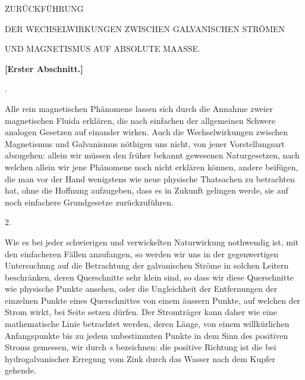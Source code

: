 \clearpage\begingroup
\NoSourceHead{}
\begin{center}
{\Large{}}\par\bigskip
ZURÜCKFÜHRUNG\par
DER WECHSELWIRKUNGEN ZWISCHEN GALVANISCHEN STRÖMEN\par
UND MAGNETISMUS AUF ABSOLUTE MAASSE.\par\bigskip
\textbf{[Erster Abschnitt.]}\par{}.
\end{center}
\noindent\hspace*{\parindent}Alle rein magnetischen Phänomene lassen sich durch die Annahme zweier magnetischen Fluida erklären, die nach einfachen der allgemeinen Schwere analogen Gesetzen auf einander wirken. Auch die Wechselwirkungen zwischen Magnetismus und Galvanismus nöthigen uns nicht, von jener Vorstellungsart abzugehen: allein wir müssen den früher bekannt gewesenen Naturgesetzen, nach welchen allein wir jene Phänomene noch nicht erklären können, andere beifügen, die man vor der Hand wenigstens wie neue physische Thatsachen zu betrachten hat, ohne die Hoffnung aufzugeben, dass es in Zukunft gelingen werde, sie auf noch einfachere Grundgesetze zurückzuführen.

\begin{center}2.\end{center}
\noindent\hspace*{\parindent}Wie es bei jeder schwierigen und verwickelten Naturwirkung nothwendig ist, mit den einfacheren Fällen anzufangen, so werden wir uns in der gegenwertigen Untersuchung auf die Betrachtung der galvanischen Ströme in solchen Leitern beschränken, deren Querschnitte sehr klein sind, so dass wir diese Querschnitte wie physische Punkte ansehen, oder die Ungleichheit der Entfernungen der einzelnen Punkte eines Querschnittes von einem äussern Punkte, auf welchen der Strom wirkt, bei Seite setzen dürfen. Der Stromträger kann
\clearpage{}
\noindent daher wie eine mathematische Linie betrachtet werden, deren Länge, von einem willkürlichen Anfangspunkte bis zu jedem unbestimmten Punkte in dem Sinn des positiven Stroms gemessen, wir durch $s$ bezeichnen: die positive Richtung ist die bei hydrogalvanischer Erregung vom Zink durch das Wasser nach dem Kupfer gehende.

